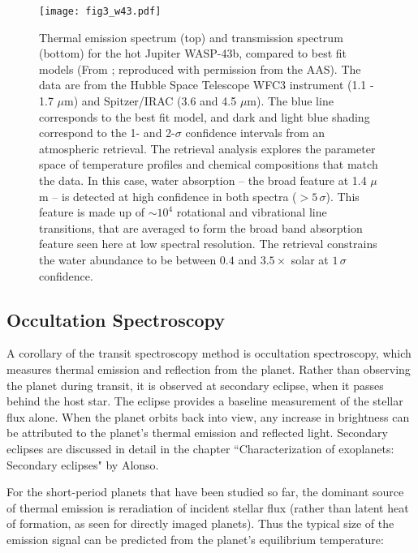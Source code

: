 \documentclass[graybox,natbib,nosecnum]{svmult}
\begin{document}
\begin{figure}
\begin{centering}
\texttt{[image: fig3\_w43.pdf]}
\caption{Thermal emission spectrum (top) and transmission spectrum (bottom) for the hot Jupiter WASP-43b, compared to best fit models (From \citealt{kreidberg15b}; reproduced with permission from the AAS). The data are from the Hubble Space Telescope WFC3 instrument (1.1 - 1.7 $\mu$m) and Spitzer/IRAC (3.6 and 4.5 $\mu$m). The blue line corresponds to the best fit model, and dark and light blue shading correspond to the 1- and 2-$\sigma$ confidence intervals from an atmospheric retrieval. The retrieval analysis explores the parameter space of temperature profiles and chemical compositions that match the data. In this case, water absorption -- the broad feature at 1.4 $\mu$m -- is detected at high confidence in both spectra ($>5\,\sigma$). This feature is made up of $\sim10^4$ rotational and vibrational line transitions, that are averaged to form the broad band absorption feature seen here at low spectral resolution. The retrieval constrains the water abundance to be between $0.4$ and $3.5\times$ solar at $1\,\sigma$ confidence.} 
\label{fig:spectra}       
\end{centering}
\end{figure}


\subsection{Occultation Spectroscopy}
A corollary of the transit spectroscopy method is occultation spectroscopy, which measures thermal emission and reflection from the planet. Rather than observing the planet during transit, it is observed at secondary eclipse, when it passes behind the host star. The eclipse provides a baseline measurement of the stellar flux alone. When the planet orbits back into view, any increase in brightness can be attributed to the planet's thermal emission and reflected light. Secondary eclipses are discussed in detail in the chapter ``Characterization of exoplanets: Secondary eclipses" by Alonso.

For the short-period planets that have been studied so far, the dominant source of thermal emission is reradiation of incident stellar flux (rather than latent heat of formation, as seen for directly imaged planets). Thus the typical size of the emission signal can be predicted from the planet's equilibrium temperature:
\end{document}
